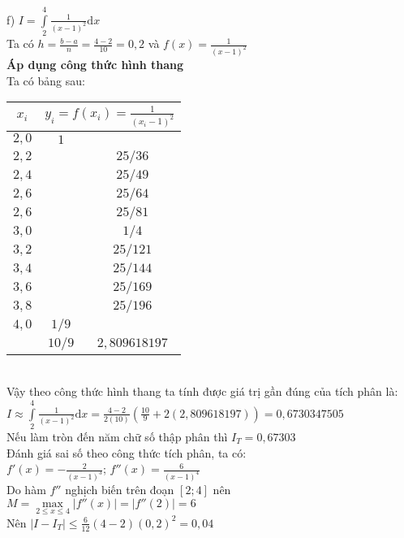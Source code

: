 f) $I= \int\limits^{4}_{2} \frac{1}{\left(x-1\right)^2}\mathrm{d}x$\\
Ta có $h=\frac{b-a}{n}=\frac{4-2}{10}=0,2$ và $f\left(x\right)=\frac{1}{\left(x-1\right)^2}$\\
\textbf{Áp dụng công thức hình thang}\\
Ta có bảng sau:\\
\begin{center}\begin{tabular}{|c|c|c|}
	\hline
	$x_i$ & \multicolumn{2}{|c|}{$y_i=f\left(x_i\right)=\frac{1}{\left(x_i-1\right)^2}$}\\
	\hline
	$2,0$ & $1$ & \\ \hline
	$2,2$ && $25/36$\\ \hline
	$2,4$ && $25/49$\\ \hline
	$2,6$ && $25/64$\\ \hline
	$2,6$ && $25/81$\\ \hline
	$3,0$ && $1/4$\\ \hline
	$3,2$ && $25/121$\\ \hline
	$3,4$ && $25/144$\\ \hline
	$3,6$ && $25/169$\\ \hline
	$3,8$ && $25/196$\\ \hline
	$4,0$ & $1/9$ & \\ \hline
	 & $10/9$ & $2,809618197$\\ \hline
\end{tabular}\end{center}\\
Vậy theo công thức hình thang ta tính được giá trị gần đúng của tích phân là:\\
$I\approx \int\limits^{4}_{2} \frac{1}{\left(x-1\right)^2}\mathrm{d}x=\frac{4-2}{2\left(10\right)}\left(\frac{10}{9}+2\left(2,809618197\right) \right) = 0,6730347505$\\
Nếu làm tròn đến năm chữ số thập phân thì $I_T = 0,67303$\\
Đánh giá sai số theo công thức tích phân, ta có:\\
$f'\left(x\right)=-\frac{2}{\left(x-1\right)^3}$; $f''\left(x\right)=\frac{6}{\left(x-1\right)^4}$\\
Do hàm $f''$ nghịch biến trên đoạn $\left[2;4\right]$ nên $ M= \underset{2\leq x \leq 4}{\max}\left|f''\left(x\right)\right| = \left|f''\left(2\right)\right|=6$ \\
Nên $\left| I - I_T\right| \leq \frac{6}{12} \left(4-2\right)\left(0,2\right)^2= 0,04$\\
